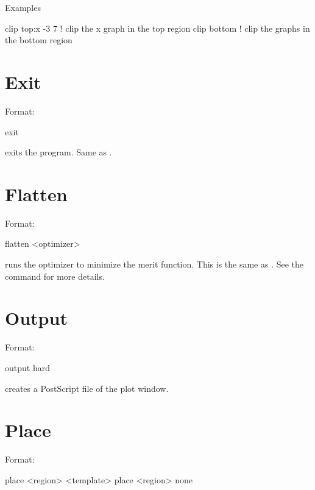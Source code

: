 Examples
\begin{example}
  clip top:x -3  7  ! clip the x graph in the top region
  clip bottom       ! clip the graphs in the bottom region
\end{example}

\section{Exit}
\label{s:exit}

Format:
\begin{example}
  exit
\end{example}

\vskip 0.2in
 exits the program. Same as .

\section{Flatten}
\label{s:flatten}

Format:
\begin{example}
  flatten <optimizer>
\end{example}

\vskip 0.2in
 runs the optimizer to minimize the merit function. This is the 
same as . See the  command for more details.

\section{Output}
\label{s:output}

Format:
\begin{example}
  output hard
\end{example}

\vskip 0.2in
 creates a PostScript file of the plot window. 

\section{Place}
\label{s:place}

Format:
\begin{example}
  place <region> <template>
  place <region> none
\end{example}

